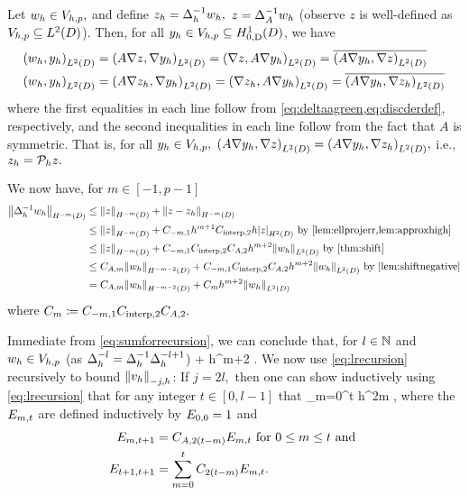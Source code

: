 Let $w_{h} \in V_{h,p},$ and define $z_{h} = \Delta_{h}^{-1} w_{h},$ $z = \Delta_{A}^{-1} w_{h}$ (observe $z$ is well-defined as $\Vhp \subseteq \LtD$). Then, for all $\yh \in \Vhp \subseteq \HozDD$, we have
\begin{align*}
\IPLtD{\wh}{\yh} &= \IPLtD{A \grad z}{\grad \yh} = \IPLtD{\grad z}{A\grad \yh} = \overline{\IPLtD{A\grad \yh}{\grad z}} \\
\IPLtD{\wh}{\yh} &= \IPLtD{A \grad \zh}{\grad \yh} = \IPLtD{\grad \zh}{A\grad \yh} = \overline{\IPLtD{A\grad \yh}{\grad \zh}}
\end{align*}
where the first equalities in each line follow from \cref{eq:deltaagreen,eq:discderdef}, respectively, and the second inequalities in each line follow from the fact that $A$ is symmetric. That is, for all $y_{h} \in V_{h,p},$ $\IPLtD{A\grad \yh}{\grad z} = \IPLtD{A\grad \yh}{\grad \zh},$ i.e., $z_{h} = \mathcal P_{h} z.$

We now have, for $m \in [-1,p-1]$
\begin{align}
\NHmmD{\DeltahI \wh} &\leq \NHmmD{z} + \NHmmD{z-\zh}\nonumber\\
&\leq \NHmmD{z} + \Cmmo h^{m+1} \Cinterpt h \SNHtD{z} \text{ by \cref{lem:ellprojerr,lem:approxhigh}}\nonumber\\
&\leq \NHmmD{z} + \Cmmo \Cinterpt \CAt h^{m+2} \NLtD{\wh} \text{ by \cref{thm:shift}}\nonumber\\
&\leq \CAm \NHmmmtD{\wh} + \Cmmo \Cinterpt \CAt h^{m+2} \NLtD{\wh} \text{ by \cref{lem:shiftnegative}}\nonumber\\
&= \CAm \NHmmmtD{\wh} + \Cm h^{m+2} \NLtD{\wh}\label{eq:sumforrecursion}
\end{align}
where $C_{m} \coloneqq C_{-m,1} C_{\mathrm{interp},2} C_{A,2}.$

Immediate from \cref{eq:sumforrecursion}, we can conclude that, for $l \in \mathbb N$ and $w_{h} \in V_{h,p}$ (as $\Delta_{h}^{-l} = \Delta_{h}^{-1} \Delta_{h}^{-l+1}$)
\beq\label{eq:lrecursion}
\NHmmD{\Deltahml \vh} \leq \CAm \NHmmmtD{\Deltahmlpo \vh} + \Cm h^{m+2} \NLtD{\Deltahmlpo \vh}.
\eeq
We now use \cref{eq:lrecursion} recursively to bound $\Nmjh{\vh}$:
If $j = 2l,$ then one can show inductively using \cref{eq:lrecursion} that for any integer $t \in [0,l-1]$ that
\beq\label{eq:evenrecursivesum}
 \leq \sum_{m=0}^t h^{2m}  ,
\eeq
where the $E_{m,t}$ are defined inductively by $E_{0,0}=1$ and
\begin{align*}
E_{m,t+1} &= C_{A,2(t-m)} E_{m,t} \text{ for } 0 \leq m \leq t \text{ and }\\
E_{t+1,t+1} &= \sum_{m=0}^t C_{2(t-m)} E_{m,t}.
\end{align*}

